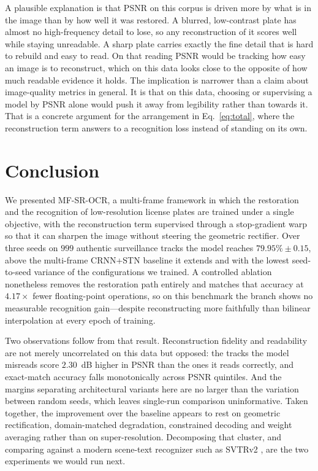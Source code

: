 \documentclass[runningheads]{llncs}
\begin{document}
A plausible explanation is that PSNR on this corpus is driven more by what is in the image than by how well it was restored. A blurred, low-contrast plate has almost no high-frequency detail to lose, so any reconstruction of it scores well while staying unreadable. A sharp plate carries exactly the fine detail that is hard to rebuild and easy to read. On that reading PSNR would be tracking how easy an image is to reconstruct, which on this data looks close to the opposite of how much readable evidence it holds. The implication is narrower than a claim about image-quality metrics in general. It is that on this data, choosing or supervising a model by PSNR alone would push it away from legibility rather than towards it. That is a concrete argument for the arrangement in Eq.~\eqref{eq:total}, where the reconstruction term answers to a recognition loss instead of standing on its own.


\section{Conclusion}
\label{sec:conclusion}

We presented MF-SR-OCR, a multi-frame framework in which the restoration and the recognition of low-resolution license plates are trained under a single objective, with the reconstruction term supervised through a stop-gradient warp so that it can sharpen the image without steering the geometric rectifier. Over three seeds on $999$ authentic surveillance tracks the model reaches $79.95\% \pm 0.15$, above the multi-frame CRNN+STN baseline it extends and with the lowest seed-to-seed variance of the configurations we trained. A controlled ablation nonetheless removes the restoration path entirely and matches that accuracy at $4.17\times$ fewer floating-point operations, so on this benchmark the branch shows no measurable recognition gain---despite reconstructing more faithfully than bilinear interpolation at every epoch of training.

Two observations follow from that result. Reconstruction fidelity and readability are not merely uncorrelated on this data but opposed: the tracks the model misreads score $2.30$~dB higher in PSNR than the ones it reads correctly, and exact-match accuracy falls monotonically across PSNR quintiles. And the margins separating architectural variants here are no larger than the variation between random seeds, which leaves single-run comparison uninformative. Taken together, the improvement over the baseline appears to rest on geometric rectification, domain-matched degradation, constrained decoding and weight averaging rather than on super-resolution. Decomposing that cluster, and comparing against a modern scene-text recognizer such as SVTRv2 \cite{du2025svtrv2}, are the two experiments we would run next.



\end{document}
